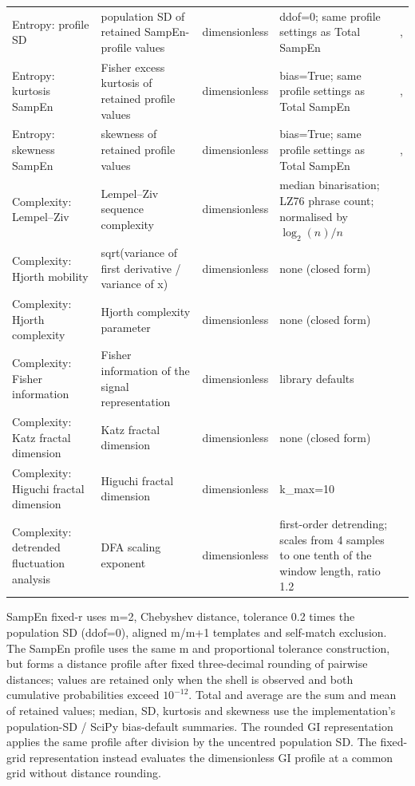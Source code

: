 \documentclass[10pt]{article}
\begin{document}
\begin{landscape}
\begin{longtable}{p{3.4cm}p{6.2cm}p{2.0cm}p{4.7cm}p{3.2cm}}
Entropy: profile SD & population SD of retained SampEn-profile values & dimensionless & ddof=0; same profile settings as Total SampEn & \citep{Udhayakumar2018SampEnProfile},\citep{udhayakumar2020entropycodes} \\
Entropy: kurtosis SampEn & Fisher excess kurtosis of retained profile values & dimensionless & bias=True; same profile settings as Total SampEn & \citep{Udhayakumar2018SampEnProfile},\citep{udhayakumar2020entropycodes} \\
Entropy: skewness SampEn & skewness of retained profile values & dimensionless & bias=True; same profile settings as Total SampEn & \citep{Udhayakumar2018SampEnProfile},\citep{udhayakumar2020entropycodes} \\
Complexity: Lempel--Ziv & Lempel--Ziv sequence complexity & dimensionless & median binarisation; LZ76 phrase count; normalised by $\log_2(n)/n$ & \citep{Lempel1976Complexity} \\
Complexity: Hjorth mobility & sqrt(variance of first derivative / variance of x) & dimensionless & none (closed form) & \citep{Hjorth1970Parameters} \\
Complexity: Hjorth complexity & Hjorth complexity parameter & dimensionless & none (closed form) & \citep{Hjorth1970Parameters} \\
Complexity: Fisher information & Fisher information of the signal representation & dimensionless & library defaults &  \\
Complexity: Katz fractal dimension & Katz fractal dimension & dimensionless & none (closed form) & \citep{Katz1988FractalWaveforms} \\
Complexity: Higuchi fractal dimension & Higuchi fractal dimension & dimensionless & k\_max=10 & \citep{Higuchi1988FractalDimension} \\
Complexity: detrended fluctuation analysis & DFA scaling exponent & dimensionless & first-order detrending; scales from 4 samples to one tenth of the window length, ratio 1.2 & \citep{Peng1994DFA} \\
\bottomrule
\end{longtable}
\par\smallskip\noindent\footnotesize SampEn fixed-r uses m=2, Chebyshev distance, tolerance 0.2 times the population SD (ddof=0), aligned m/m+1 templates and self-match exclusion. The SampEn profile uses the same m and proportional tolerance construction, but forms a distance profile after fixed three-decimal rounding of pairwise distances; values are retained only when the shell is observed and both cumulative probabilities exceed $10^{-12}$. Total and average are the sum and mean of retained values; median, SD, kurtosis and skewness use the implementation's population-SD / SciPy bias-default summaries. The rounded GI representation applies the same profile after division by the uncentred population SD. The fixed-grid representation instead evaluates the dimensionless GI profile at a common grid without distance rounding.
\end{landscape}
\end{document}
